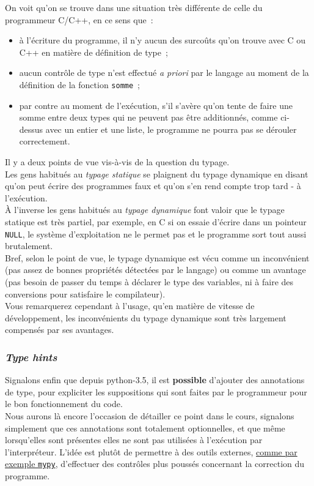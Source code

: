     On voit qu'on se trouve dans une situation très différente de celle du
programmeur C/C++, en ce sens que~:

\begin{itemize}
\tightlist
\item
  à l'écriture du programme, il n'y aucun des surcoûts qu'on trouve avec
  C ou C++ en matière de définition de type~;
\item
  aucun contrôle de type n'est effectué \emph{a priori} par le langage
  au moment de la définition de la fonction \texttt{somme}~;
\item
  par contre au moment de l'exécution, s'il s'avère qu'on tente de faire
  une somme entre deux types qui ne peuvent pas être additionnés, comme
  ci-dessus avec un entier et une liste, le programme ne pourra pas se
  dérouler correctement.
\end{itemize}

    Il y a deux points de vue vis-à-vis de la question du typage.\\

Les gens habitués au \emph{typage statique} se plaignent du typage
dynamique en disant qu'on peut écrire des programmes faux et qu'on s'en
rend compte trop tard - à l'exécution.\\

À l'inverse les gens habitués au \emph{typage dynamique} font valoir que
le typage statique est très partiel, par exemple, en C si on essaie
d'écrire dans un pointeur \texttt{NULL}, le système d'exploitation ne le
permet pas et le programme sort tout aussi brutalement.\\

    Bref, selon le point de vue, le typage dynamique est vécu comme un
inconvénient (pas assez de bonnes propriétés détectées par le langage)
ou comme un avantage (pas besoin de passer du temps à déclarer le type
des variables, ni à faire des conversions pour satisfaire le
compilateur).\\

Vous remarquerez cependant à l'usage, qu'en matière de vitesse de
développement, les inconvénients du typage dynamique sont très largement
compensés par ses avantages.

    \hypertarget{type-hints}{%
\subsubsection{\texorpdfstring{\emph{Type
hints}}{Type hints}}\label{type-hints}}

    Signalons enfin que depuis python-3.5, il est \textbf{possible}
d'ajouter des annotations de type, pour expliciter les suppositions qui
sont faites par le programmeur pour le bon fonctionnement du code.\\

Nous aurons là encore l'occasion de détailler ce point dans le cours,
signalons simplement que ces annotations sont totalement optionnelles,
et que même lorsqu'elles sont présentes elles ne sont pas utilisées à
l'exécution par l'interpréteur. L'idée est plutôt de permettre à des
outils externes, \href{http://www.mypy-lang.org}{comme par exemple
\texttt{mypy}}, d'effectuer des contrôles plus poussés concernant la
correction du programme.